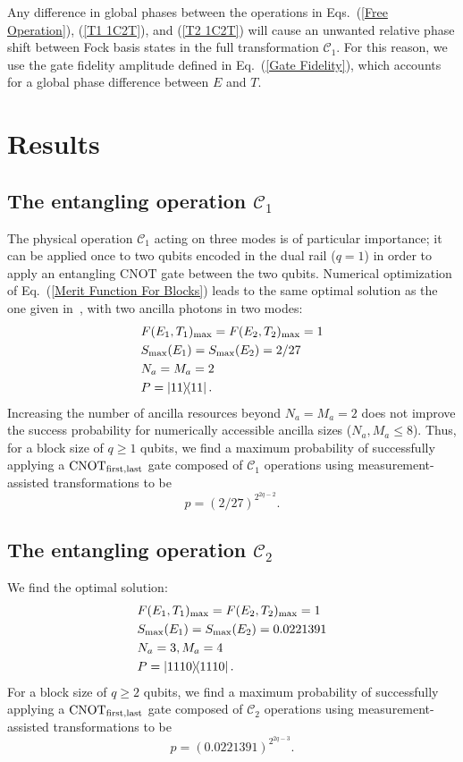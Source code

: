 \documentclass[aps,pra,twocolumn,superscriptaddress,floatfix,10pt]{revtex4}
\begin{document}
Any difference in global phases between the operations in Eqs.~(\ref{Free Operation}), (\ref{T1 1C2T}), and (\ref{T2 1C2T}) will cause an unwanted relative phase shift between Fock basis states in the full transformation $\mathcal{C}_1$. For this reason, we use the gate fidelity amplitude defined in Eq.~(\ref{Gate Fidelity}), which accounts for a global phase difference between $E$ and $T$. 
\section{Results}
\label{Section on Results}
\subsection{The entangling operation $\mathcal{C}_1$}
The physical operation $\mathcal{C}_1$ acting on three modes is of particular importance; it can be applied once to two qubits encoded in the dual rail ($q=1$) in order to apply an entangling $\mbox{CNOT}$ gate between the two qubits. Numerical optimization of Eq.~(\ref{Merit Function For Blocks}) leads to the same optimal solution as the one given in~\cite{Uskov}, with two ancilla photons in two modes:
\begin{eqnarray}
& F(E_1,T_1)_{\rm max} = F(E_2,T_2)_{\rm max} = 1 \nonumber \\
& S_{\rm max}(E_1) = S_{\rm max}(E_2) = 2/27 \\
& N_a=M_a=2 \nonumber \\
& P = \outerproduct{11}{11} \nonumber	.
\end{eqnarray}
Increasing the number of ancilla resources beyond $N_a=M_a=2$ does not improve the success probability for numerically accessible ancilla sizes ($N_a,M_a \le 8$). Thus, for a block size of $q \ge 1$ qubits, we find a maximum probability of successfully applying a $\mbox{CNOT}_{\rm first,last}$ gate composed of $\mathcal{C}_1$ operations using measurement-assisted transformations to be
\begin{equation}
\label{1C2T Result}
p = (2/27)^{2^{2q-2}}.
\end{equation}
\subsection{The entangling operation $\mathcal{C}_2$}
We find the optimal solution:
\begin{eqnarray}
& F(E_1,T_1)_{\rm max} = F(E_2,T_2)_{\rm max} = 1 \nonumber \\
&S_{\rm max}(E_1) = S_{\rm max}(E_2) = 0.0221391 \\
&N_a = 3,M_a=4 \nonumber \\
&P = \outerproduct{1110}{1110} \nonumber	.
\end{eqnarray}
For a block size of $q \ge 2$ qubits, we find a maximum probability of successfully applying a $\mbox{CNOT}_{\rm first,last}$ gate composed of $\mathcal{C}_2$ operations  using measurement-assisted transformations to be
\begin{equation}
\label{2C2T Result}
p = (0.0221391)^{2^{2q-3}}.
\end{equation}
\end{document}
